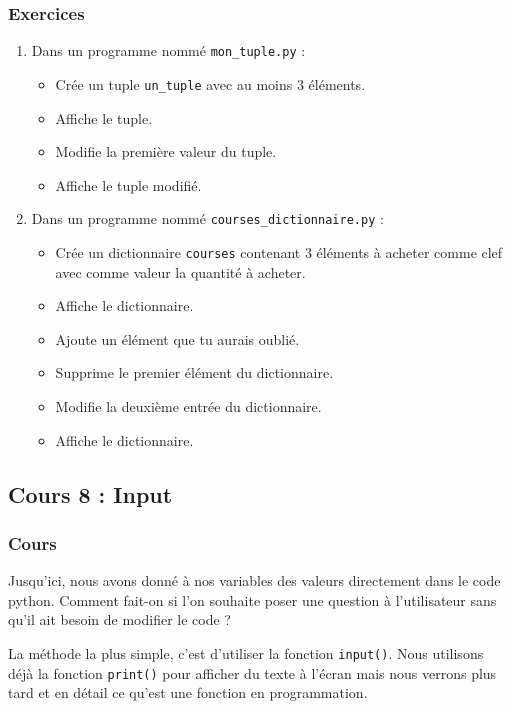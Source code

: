 \documentclass[11pt]{article}
\begin{document}
\subsubsection*{Exercices}
\label{sec:org1019d44}
\begin{enumerate}
\item Dans un programme nommé \texttt{mon\_tuple.py} :
\begin{itemize}
\item Crée un tuple \texttt{un\_tuple} avec au moins 3 éléments.
\item Affiche le tuple.
\item Modifie la première valeur du tuple.
\item Affiche le tuple modifié.
\end{itemize}

\item Dans un programme nommé \texttt{courses\_dictionnaire.py} :
\begin{itemize}
\item Crée un dictionnaire \texttt{courses} contenant 3 éléments à acheter comme clef avec comme valeur la quantité à acheter.
\item Affiche le dictionnaire.
\item Ajoute un élément que tu aurais oublié.
\item Supprime le premier élément du dictionnaire.
\item Modifie la deuxième entrée du dictionnaire.
\item Affiche le dictionnaire.
\end{itemize}
\end{enumerate}

\subsection*{Cours 8 : Input}
\label{chapitre2_cours8}
\subsubsection*{Cours}
\label{sec:orgaa97afb}
Jusqu'ici, nous avons donné à nos variables des valeurs directement dans le code python. Comment fait-on si l'on souhaite poser une question à l'utilisateur sans qu'il ait besoin de modifier le code ?

La méthode la plus simple, c'est d'utiliser la fonction \texttt{input()}. Nous utilisons déjà la fonction \texttt{print()} pour afficher du texte à l'écran mais nous verrons plus tard et en détail ce qu'est une fonction en programmation.
\end{document}

